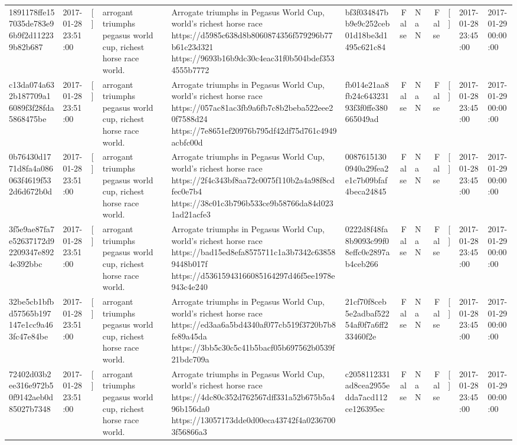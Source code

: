 \begin{tabular}{llllllrlrlll}
1891178ffe157035de783e96b9f2d112239b82b687 & 2017-01-28 23:51:00 & [] & arrogant triumphs pegasus world cup, richest horse race world. & Arrogate triumphs in Pegasus World Cup, world's richest horse race https://d5985c638d8b8060874356f579296b77b61c23d321 https://9693b16b9dc30c4eac31f0b504bdef3534555b7772 & bf3f034847bb9e9c252ceb01d18be3d1495c621c84 & False & NaN & False & [] & 2017-01-28 23:45:00 & 2017-01-29 00:00:00 \\
c13da074a632b187709a16089f3f28fda5868475be & 2017-01-28 23:51:00 & [] & arrogant triumphs pegasus world cup, richest horse race world. & Arrogate triumphs in Pegasus World Cup, world's richest horse race https://057ac81ac3fb9a6fb7c8b2beba522eee20f7588d24 https://7e8651ef20976b795df42df75d761c4949acbfc00d & fb014e21aa8fb24c64323193f3f0ffe380665049ad & False & NaN & False & [] & 2017-01-28 23:45:00 & 2017-01-29 00:00:00 \\
0b76430d1771d8fa4a086063f4619f532d6d672b0d & 2017-01-28 23:51:00 & [] & arrogant triumphs pegasus world cup, richest horse race world. & Arrogate triumphs in Pegasus World Cup, world's richest horse race https://2f4c343bf8aa72c0075f110b2a4a98f8cdfec0e7b4 https://38c01c3b796b533ce9b58766da84d0231ad21acfe3 & 00876151300940a29fea2e1c7b09bfaf4beca24845 & False & NaN & False & [] & 2017-01-28 23:45:00 & 2017-01-29 00:00:00 \\
3f5e9ae87fa7e52637172d92209347e8924e392bbc & 2017-01-28 23:51:00 & [] & arrogant triumphs pegasus world cup, richest horse race world. & Arrogate triumphs in Pegasus World Cup, world's richest horse race https://bad15ed8efa8575711c1a3b7342c638589448b017f https://d53615943166085164297d46f5ee1978e943c4e240 & 0222d8f48fa8b9093c99f08effc0e2897ab4ceb266 & False & NaN & False & [] & 2017-01-28 23:45:00 & 2017-01-29 00:00:00 \\
32be5cb1bfbd57565b197147e1cc9a463fc47e84be & 2017-01-28 23:51:00 & [] & arrogant triumphs pegasus world cup, richest horse race world. & Arrogate triumphs in Pegasus World Cup, world's richest horse race https://ed3aa6a5bd4340af077cb519f3720b7b8fe89a45da https://3bb5c30c5c41b5bacf05b697562b0539f21bdc709a & 21cf70f8ceb5e2adbaf52254af0f7a6ff233460f2e & False & NaN & False & [] & 2017-01-28 23:45:00 & 2017-01-29 00:00:00 \\
72402d03b2ee316e972b50f9142aeb0d85027b7348 & 2017-01-28 23:51:00 & [] & arrogant triumphs pegasus world cup, richest horse race world. & Arrogate triumphs in Pegasus World Cup, world's richest horse race https://4dc80c352d762567dff331a52b675b5a496b156da0 https://13057173dde0d00eca43742f4a02367003f56866a3 & c2058112331ad8cea2955edda7acd112ce126395ec & False & NaN & False & [] & 2017-01-28 23:45:00 & 2017-01-29 00:00:00 \\

\end{tabular}
